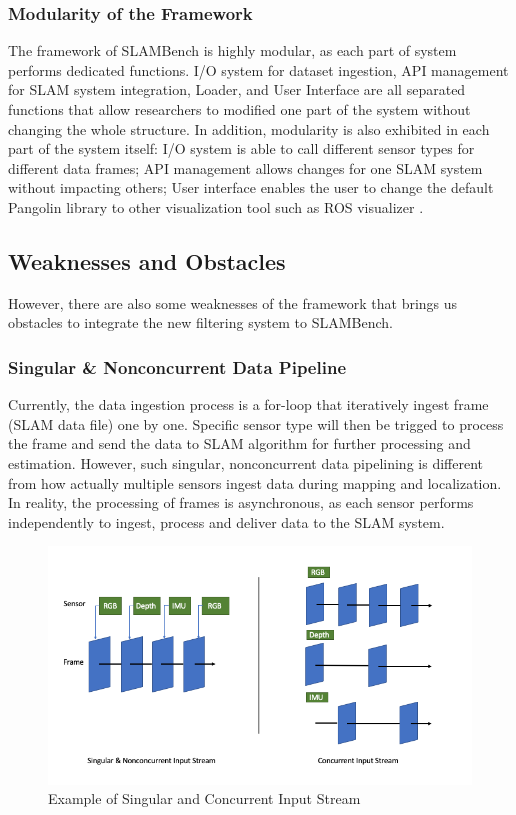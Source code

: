 \subsubsection*{Modularity of the Framework}
The framework of SLAMBench is highly modular, as each part of system performs dedicated functions. 
I/O system for dataset ingestion, API management for SLAM system integration, Loader, and User Interface are all separated functions that allow researchers to modified one part of the system without changing the whole structure. 
In addition, modularity is also exhibited in each part of the system itself: I/O system is able to call different sensor types for different data frames; API management allows changes for one SLAM system without impacting others; User interface enables the user to change the default Pangolin library \cite{Pangolin} to other visualization tool such as ROS visualizer \cite{ROS}.  

\subsection{Weaknesses and Obstacles}
However, there are also some weaknesses of the framework that brings us obstacles to integrate the new filtering system to SLAMBench.

\subsubsection*{Singular \& Nonconcurrent Data Pipeline}
Currently, the data ingestion process is a for-loop that iteratively ingest frame (SLAM data file) one by one. 
Specific sensor type will then be trigged to process the frame and send the data to SLAM algorithm for further processing and estimation. 
However, such singular, nonconcurrent data pipelining is different from how actually multiple sensors ingest data during mapping and localization. 
In reality, the processing of frames is asynchronous, as each sensor performs independently to ingest, process and deliver data to the SLAM system. 

\begin{figure}[h]
	\caption{Example of Singular and Concurrent Input Stream}
	\includegraphics[width=14cm]{figures/concurrency.png}
	\centering
\end{figure}

